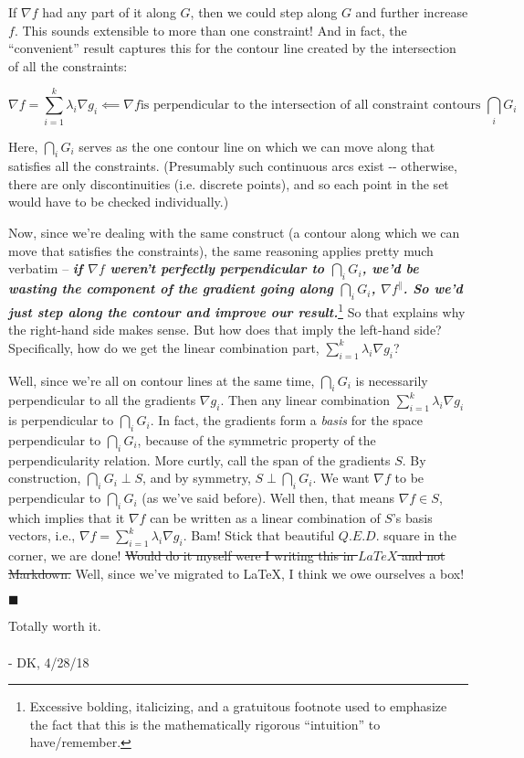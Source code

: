\documentclass[letterpaper,12pt]{report}
\begin{document}
If \(\nabla f\) had any part of it along \(G\), then we could step along
\(G\) and further increase \(f\). This sounds extensible to more than
one constraint! And in fact, the ``convenient'' result captures this for
the contour line created by the intersection of all the constraints:

\[
  \nabla f = \sum_{i=1}^k \lambda _i \nabla g_i  \impliedby
  \nabla f \text{is perpendicular to the intersection
  of all constraint contours } \bigcap _i G_i 
\]

Here, \(\bigcap _i G_i\) serves as the one contour line on which we can
move along that satisfies all the constraints. (Presumably such
continuous arcs exist -\/- otherwise, there are only discontinuities
(i.e. discrete points), and so each point in the set would have to be
checked individually.)

Now, since we're dealing with the same construct (a contour along which
we can move that satisfies the constraints), the same reasoning applies
pretty much verbatim -- \emph{\textbf{if \(\nabla f\) weren't perfectly
perpendicular to \(\bigcap _i G_i\), we'd be wasting the component of
the gradient going along \(\bigcap _i G_i\), \(\nabla f ^{\parallel}\).
So we'd just step along the contour and improve our result.}}\footnote{
  Excessive bolding, italicizing, and a gratuitous footnote 
  used to emphasize the fact that this is the
  mathematically rigorous ``intuition'' to have/remember.
}
So that explains why the right-hand side makes sense. But how does that
imply the left-hand side? Specifically, how do we get the linear
combination part, \( \sum_{i=1}^k \lambda _i \nabla g_i \)?

Well, since we're all on contour lines at the same time,
\(\bigcap _i G_i\) is necessarily perpendicular to all the gradients
\(\nabla g_i\). Then any linear combination \(\sum_{i=1}^k
\lambda _i \nabla g_i \) is perpendicular to \(\bigcap _i G_i\).
In fact, the gradients form a \emph{basis} for the space perpendicular
to \(\bigcap _i G_i\), because of the symmetric property of the
perpendicularity relation. More curtly, call the span of the gradients
\(S\). By construction, \(\bigcap _i G_i \perp S\), and by symmetry, \(S
\perp \bigcap _i G_i\). We want \(\nabla f\) to be perpendicular to
\(\bigcap _i G_i\) (as we've said before). Well then, that means
\(\nabla f \in S\), which implies that it \(\nabla f\) can be written as
a linear combination of \(S\)'s basis vectors, i.e., \( \nabla f =
\sum _{i=1}^k \lambda _i \nabla g_i \). Bam! Stick that beautiful
\(Q.E.D.\) square in the corner, we are done! \sout{Would do it myself were I
writing this in \(LaTeX\) and not Markdown.} 
Well, since we've migrated to LaTeX, I think we owe ourselves a box!
\begin{flushright}$\blacksquare$\end{flushright}
Totally worth it.
\\
\\
- DK, 4/28/18
\end{document}
